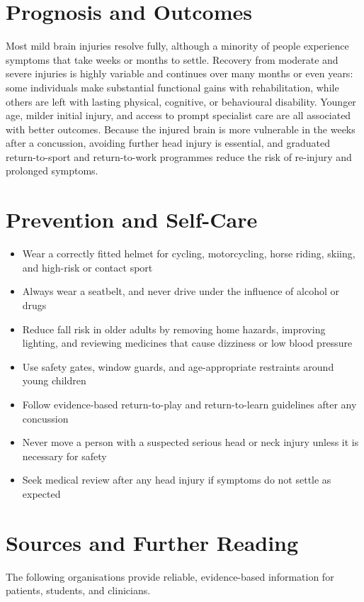 \section*{Prognosis and Outcomes}
Most mild brain injuries resolve fully, although a minority of people experience symptoms that take weeks or months to settle. Recovery from moderate and severe injuries is highly variable and continues over many months or even years: some individuals make substantial functional gains with rehabilitation, while others are left with lasting physical, cognitive, or behavioural disability. Younger age, milder initial injury, and access to prompt specialist care are all associated with better outcomes. Because the injured brain is more vulnerable in the weeks after a concussion, avoiding further head injury is essential, and graduated return-to-sport and return-to-work programmes reduce the risk of re-injury and prolonged symptoms.

\section*{Prevention and Self-Care}
\begin{itemize}
    \item Wear a correctly fitted helmet for cycling, motorcycling, horse riding, skiing, and high-risk or contact sport
    \item Always wear a seatbelt, and never drive under the influence of alcohol or drugs
    \item Reduce fall risk in older adults by removing home hazards, improving lighting, and reviewing medicines that cause dizziness or low blood pressure
    \item Use safety gates, window guards, and age-appropriate restraints around young children
    \item Follow evidence-based return-to-play and return-to-learn guidelines after any concussion
    \item Never move a person with a suspected serious head or neck injury unless it is necessary for safety
    \item Seek medical review after any head injury if symptoms do not settle as expected
\end{itemize}

\section*{Sources and Further Reading}
The following organisations provide reliable, evidence-based information for patients, students, and clinicians.

